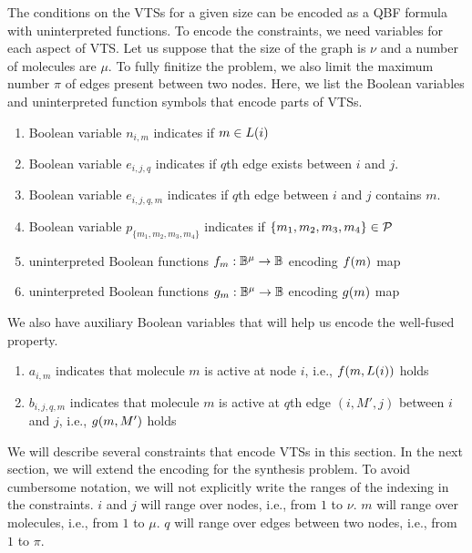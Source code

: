 The conditions on the VTSs for a given size can be encoded as a QBF formula
with uninterpreted functions.
%
To encode the constraints, we need variables for each aspect of
VTS.
%
Let us suppose that the size of the graph is $\nu$ and a number of
molecules are $\mu$.
%
To fully finitize the problem, we also limit the maximum number $\pi$
of edges present between two nodes.
%
Here, we list the Boolean variables and uninterpreted function symbols
that encode parts of VTSs.
\begin{enumerate}

\item Boolean variable $n_{i,m}$ indicates if $m \in L(i)$
\item Boolean variable $e_{i,j,q}$ indicates if $q$th edge exists between $i$ and $j$.
\item Boolean variable $e_{i,j,q,m}$ indicates if $q$th edge between $i$ and $j$ contains $m$.
\item Boolean variable $p_{\{m_1,m_2,m_3,m_4\}}$ indicates if $\{m_1,m_2,m_3,m_4\} \in \mathcal{P}$
\item uninterpreted Boolean functions $f_m : \mathbb{B}^\mu \rightarrow \mathbb{B}$
encoding $f(m)$ map
\item uninterpreted Boolean functions $g_m : \mathbb{B}^\mu \rightarrow \mathbb{B}$
encoding $g(m)$ map
\end{enumerate}
We also have auxiliary Boolean variables that will help us encode the well-fused property. 
\begin{enumerate}
\item $a_{i,m}$ indicates that molecule $m$ is active at node $i$, i.e., $f(m,L(i))$
  holds
\item $b_{i,j,q,m}$ indicates that molecule $m$ is active at $q$th edge $(i,M',j)$ between $i$ and $j$, i.e., $g(m,M')$ holds
\end{enumerate}

We will describe several constraints that encode VTSs in this section.
%
In the next section, we will extend the encoding for the synthesis problem.
%
To avoid cumbersome notation, we will not explicitly write the ranges
of the indexing in the constraints.
%
$i$ and $j$ will range over nodes, i.e., from $1$ to $\nu$.
%
$m$ will range over molecules, i.e., from $1$ to $\mu$.
%
$q$ will range over edges between two nodes, i.e., from $1$ to $\pi$.
%

